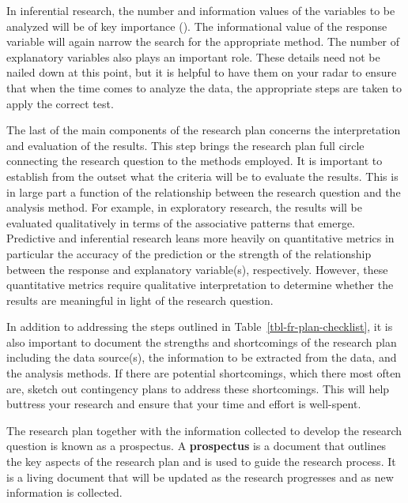 \documentclass[
  letterpaper,
  DIV=11,
  numbers=noendperiod]{scrreprt}
\theoremstyle{definition}
\theoremstyle{remark}
\begin{document}
In inferential research, the number and information values of the
variables to be analyzed will be of key importance
(). The informational value
of the response variable will again narrow the search for the
appropriate method. The number of explanatory variables also plays an
important role. These details need not be nailed down at this point, but
it is helpful to have them on your radar to ensure that when the time
comes to analyze the data, the appropriate steps are taken to apply the
correct test.

The last of the main components of the research plan concerns the
interpretation and evaluation of the results. This step brings the
research plan full circle connecting the research question to the
methods employed. It is important to establish from the outset what the
criteria will be to evaluate the results. This is in large part a
function of the relationship between the research question and the
analysis method. For example, in exploratory research, the results will
be evaluated qualitatively in terms of the associative patterns that
emerge. Predictive and inferential research leans more heavily on
quantitative metrics in particular the accuracy of the prediction or the
strength of the relationship between the response and explanatory
variable(s), respectively. However, these quantitative metrics require
qualitative interpretation to determine whether the results are
meaningful in light of the research question.

In addition to addressing the steps outlined in
Table~\ref{tbl-fr-plan-checklist}, it is also important to document the
strengths and shortcomings of the research plan including the data
source(s), the information to be extracted from the data, and the
analysis methods. If there are potential shortcomings, which there most
often are, sketch out contingency plans to address these shortcomings.
This will help buttress your research and ensure that your time and
effort is well-spent.

The research plan together with the information collected to develop the
research question is known as a prospectus. A \textbf{prospectus} is a
document that outlines the key aspects of the research plan and is used
to guide the research process. It is a living document that will be
updated as the research progresses and as new information is collected.
\end{document}
